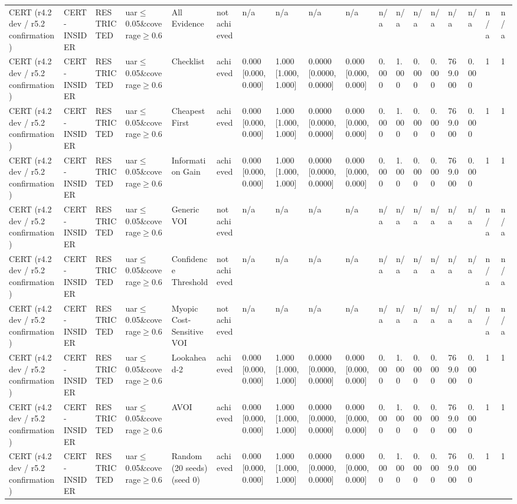 \begin{table}[!ht]
{\begin{tabular}{llllllllllllllllll}
CERT (r4.2 dev / r5.2 confirmation) & CERT-INSIDER & RESTRICTED & uar$\le$0.05\&coverage$\ge$0.6 & All Evidence & not achieved & n/a & n/a & n/a & n/a & n/a & n/a & n/a & n/a & n/a & n/a & n/a & n/a \\
CERT (r4.2 dev / r5.2 confirmation) & CERT-INSIDER & RESTRICTED & uar$\le$0.05\&coverage$\ge$0.6 & Checklist & achieved & 0.000 [0.000, 0.000] & 1.000 [1.000, 1.000] & 0.0000 [0.0000, 0.0000] & 0.000 [0.000, 0.000] & 0.000 & 1.000 & 0.000 & 0.000 & 769.000 & 0.000 & 1 & 1 \\
CERT (r4.2 dev / r5.2 confirmation) & CERT-INSIDER & RESTRICTED & uar$\le$0.05\&coverage$\ge$0.6 & Cheapest First & achieved & 0.000 [0.000, 0.000] & 1.000 [1.000, 1.000] & 0.0000 [0.0000, 0.0000] & 0.000 [0.000, 0.000] & 0.000 & 1.000 & 0.000 & 0.000 & 769.000 & 0.000 & 1 & 1 \\
CERT (r4.2 dev / r5.2 confirmation) & CERT-INSIDER & RESTRICTED & uar$\le$0.05\&coverage$\ge$0.6 & Information Gain & achieved & 0.000 [0.000, 0.000] & 1.000 [1.000, 1.000] & 0.0000 [0.0000, 0.0000] & 0.000 [0.000, 0.000] & 0.000 & 1.000 & 0.000 & 0.000 & 769.000 & 0.000 & 1 & 1 \\
CERT (r4.2 dev / r5.2 confirmation) & CERT-INSIDER & RESTRICTED & uar$\le$0.05\&coverage$\ge$0.6 & Generic VOI & not achieved & n/a & n/a & n/a & n/a & n/a & n/a & n/a & n/a & n/a & n/a & n/a & n/a \\
CERT (r4.2 dev / r5.2 confirmation) & CERT-INSIDER & RESTRICTED & uar$\le$0.05\&coverage$\ge$0.6 & Confidence Threshold & not achieved & n/a & n/a & n/a & n/a & n/a & n/a & n/a & n/a & n/a & n/a & n/a & n/a \\
CERT (r4.2 dev / r5.2 confirmation) & CERT-INSIDER & RESTRICTED & uar$\le$0.05\&coverage$\ge$0.6 & Myopic Cost-Sensitive VOI & not achieved & n/a & n/a & n/a & n/a & n/a & n/a & n/a & n/a & n/a & n/a & n/a & n/a \\
CERT (r4.2 dev / r5.2 confirmation) & CERT-INSIDER & RESTRICTED & uar$\le$0.05\&coverage$\ge$0.6 & Lookahead-2 & achieved & 0.000 [0.000, 0.000] & 1.000 [1.000, 1.000] & 0.0000 [0.0000, 0.0000] & 0.000 [0.000, 0.000] & 0.000 & 1.000 & 0.000 & 0.000 & 769.000 & 0.000 & 1 & 1 \\
CERT (r4.2 dev / r5.2 confirmation) & CERT-INSIDER & RESTRICTED & uar$\le$0.05\&coverage$\ge$0.6 & AVOI & achieved & 0.000 [0.000, 0.000] & 1.000 [1.000, 1.000] & 0.0000 [0.0000, 0.0000] & 0.000 [0.000, 0.000] & 0.000 & 1.000 & 0.000 & 0.000 & 769.000 & 0.000 & 1 & 1 \\
CERT (r4.2 dev / r5.2 confirmation) & CERT-INSIDER & RESTRICTED & uar$\le$0.05\&coverage$\ge$0.6 & Random (20 seeds) (seed 0) & achieved & 0.000 [0.000, 0.000] & 1.000 [1.000, 1.000] & 0.0000 [0.0000, 0.0000] & 0.000 [0.000, 0.000] & 0.000 & 1.000 & 0.000 & 0.000 & 769.000 & 0.000 & 1 & 1 \\

\end{tabular}}
\end{table}
